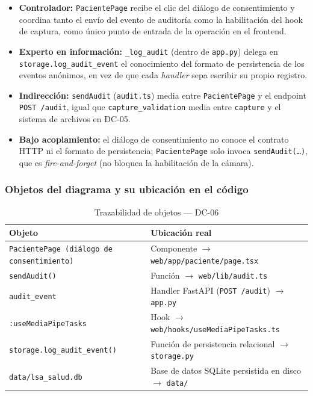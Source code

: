 \begin{itemize}[leftmargin=*, itemsep=2pt]
    \item \textbf{Controlador:} \texttt{PacientePage} recibe el clic del
    diálogo de consentimiento y coordina tanto el envío del evento de
    auditoría como la habilitación del hook de captura, como único punto
    de entrada de la operación en el frontend.
    \item \textbf{Experto en información:} \texttt{\_log\_audit} (dentro de
    \texttt{app.py}) delega en \texttt{storage.log\_audit\_event} el
    conocimiento del formato de persistencia de los eventos anónimos, en
    vez de que cada \textit{handler} sepa escribir su propio registro.
    \item \textbf{Indirección:} \texttt{sendAudit} (\texttt{audit.ts}) media
    entre \texttt{PacientePage} y el endpoint \texttt{POST /audit}, igual
    que \texttt{capture\_validation} media entre \texttt{capture} y el
    sistema de archivos en DC-05.
    \item \textbf{Bajo acoplamiento:} el diálogo de consentimiento no conoce
    el contrato HTTP ni el formato de persistencia; \texttt{PacientePage}
    solo invoca \texttt{sendAudit(\ldots)}, que es \textit{fire-and-forget}
    (no bloquea la habilitación de la cámara).
\end{itemize}

\subsubsection{Objetos del diagrama y su ubicación en el código}

\begin{table}[H]
\centering
\begin{tabularx}{\textwidth}{@{}l X@{}}
\toprule
\textbf{Objeto} & \textbf{Ubicación real} \\
\midrule
\texttt{PacientePage (diálogo de consentimiento)} & Componente $\rightarrow$ \texttt{web/app/paciente/page.tsx} \\
\texttt{sendAudit()} & Función $\rightarrow$ \texttt{web/lib/audit.ts} \\
\texttt{audit\_event} & Handler FastAPI (\texttt{POST /audit}) $\rightarrow$ \texttt{app.py} \\
\texttt{:useMediaPipeTasks} & Hook $\rightarrow$ \texttt{web/hooks/useMediaPipeTasks.ts} \\
\texttt{storage.log\_audit\_event()} & Función de persistencia relacional $\rightarrow$ \texttt{storage.py} \\
\texttt{data/lsa\_salud.db} & Base de datos SQLite persistida en disco $\rightarrow$ \texttt{data/} \\
\bottomrule
\end{tabularx}
\caption{Trazabilidad de objetos --- DC-06}
\label{tab:col-objetos-dc06}
\end{table}

